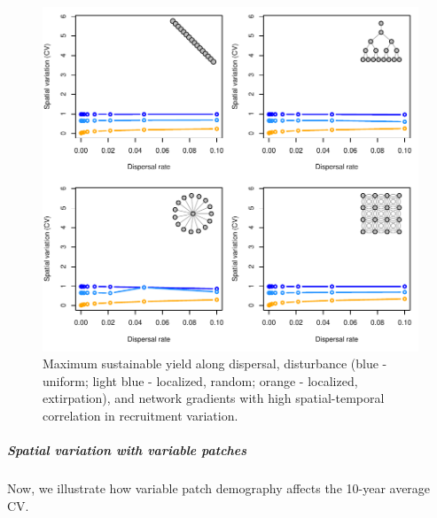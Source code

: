 \documentclass[]{article}
\let\oldsubparagraph\subparagraph
\renewcommand{\subparagraph}[1]{\oldsubparagraph{#1}\mbox{}}
\begin{document}
\begin{figure}[H]

{\centering \includegraphics{Managing_for_ecological_surprises_in_metapopulations_makeHTML_files/figure-latex/CV-1} 

}

\caption{Maximum sustainable yield along dispersal, disturbance (blue - uniform; light blue - localized, random; orange - localized, extirpation), and network gradients with high spatial-temporal correlation in recruitment variation.}\label{fig:CV}
\end{figure}

\subparagraph{Spatial variation with variable
patches}\label{spatial-variation-with-variable-patches}

Now, we illustrate how variable patch demography affects the 10-year
average CV.
\end{document}
